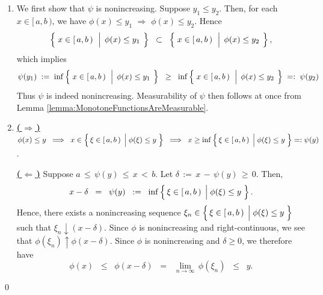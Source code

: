 \begin{enumerate}
\item
	We first show that $\psi$ is nonincreasing.
	Suppose $y_{1} \leq y_{2}$. Then, for each $x \in [\,a,b\,)$, we have
	$\phi(x) \leq y_{1}$ $\Longrightarrow$ $\phi(x) \leq y_{2}$.
	Hence
	\begin{equation*}
	\left\{\;
		x \in [\,a,b\,)
		\,\;\left\vert\;\,
			\overset{{\color{white}.}}{\phi}(x) \leq y_{1}
		\right.
		\;\right\}
	\;\; \subset \;\;
	\left\{\;
		x \in [\,a,b\,)
		\,\;\left\vert\;\,
			\overset{{\color{white}.}}{\phi}(x) \leq y_{2}
		\right.
		\;\right\},
	\end{equation*}
	which implies
	\begin{equation*}
	\psi(y_{1}) \; := \;
	\inf\left\{\;
		x \in [\,a,b\,)
		\,\;\left\vert\;\,
			\overset{{\color{white}.}}{\phi}(x) \leq y_{1}
		\right.
		\;\right\}
	\;\; \geq \;\;
	\inf\left\{\;
		x \in [\,a,b\,)
		\,\;\left\vert\;\,
			\overset{{\color{white}.}}{\phi}(x) \leq y_{2}
		\right.
		\;\right\}
	\; =: \; \psi(y_{2})
	\end{equation*}
	Thus $\psi$ is indeed nonincreasing.
	Measurability of $\psi$ then follows at once from Lemma \ref{lemma:MonotoneFunctionsAreMeasurable}.
\item
	\textbf{\underline{(\,$\Longrightarrow$\,)}}\quad
	$\phi(x) \leq y
	\;\;\Longrightarrow\;\;
		x \in \left\{\,\xi\in[\,a,b\,) \;\left\vert\; \phi(\xi) \overset{{\color{white}.}}{\leq} y\right.\,\right\}
	\;\; \Longrightarrow \;\;
		x \geq \inf\left\{\,\xi\in[\,a,b\,) \;\left\vert\; \phi(\xi) \overset{{\color{white}.}}{\leq} y\right.\,\right\} =: \psi(y)$.

	\vskip 0.2cm
	\noindent
	\textbf{\underline{(\,$\Longleftarrow$\,)}}\quad
	Suppose \;$a \,\leq\, \psi(y) \,\leq\, x \,<\, b$.\;
	Let \;$\delta \,:=\, x \,-\, \psi(y) \,\geq\, 0$. Then,
	\begin{equation*}
	x - \delta \;\;=\;\; \psi(y) \;\;:=\;\; \inf\left\{\,\xi\in[\,a,b\,) \;\left\vert\; \phi(\xi) \overset{{\color{white}.}}{\leq} y\right.\,\right\}.
	\end{equation*}
	Hence, there exists a nonincreasing sequence
	$\xi_{n} \in \left\{\,\xi\in[\,a,b\,) \;\left\vert\; \phi(\xi) \overset{{\color{white}.}}{\leq} y\right.\,\right\}$
	such that $\xi_{n} \downarrow (x-\delta)$.
	Since $\phi$ is {\color{red}nonincreasing and right-continuous}, we see that $\phi(\xi_{n}) \uparrow \phi(x-\delta)$.
	Since $\phi$ is nonincreasing and $\delta \geq 0$, we therefore have
	\begin{equation*}
	\phi(x) \;\;\leq\;\; \phi(x-\delta) \;\;=\;\; \underset{n\rightarrow\infty}{\lim}\,\phi(\xi_{n}) \;\;\leq\;\; y.
	\end{equation*}
\end{enumerate}
\qed

